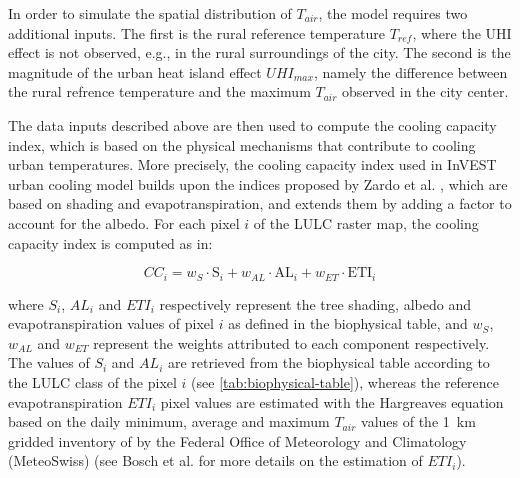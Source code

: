 \documentclass[10pt,letterpaper]{article}
\begin{document}
In order to simulate the spatial distribution of $T_{air}$, the model requires two additional inputs. The first is the rural reference temperature $T_{ref}$, where the UHI effect is not observed, e.g., in the rural surroundings of the city. The second is the magnitude of the urban heat island effect $UHI_{max}$, namely the difference between the rural refrence temperature and the maximum $T_{air}$ observed in the city center.

The data inputs described above are then used to compute the cooling capacity index, which is based on the physical mechanisms that contribute to cooling urban temperatures. More precisely, the cooling capacity index used in InVEST urban cooling model builds upon the indices proposed by Zardo et al. \cite{zardo2017estimating}, which are based on shading and evapotranspiration, and extends them by adding a factor to account for the albedo.
For each pixel $i$ of the LULC raster map, the cooling capacity index is computed as in:

\begin{equation}
  \label{eq:cooling-capacity}
  CC_i = w_{S} \cdot \textrm{S}_i + w_{AL} \cdot \textrm{AL}_i + w_{ET} \cdot \textrm{ETI}_i
\end{equation}

where $S_i$, $AL_i$ and $ETI_i$ respectively represent the tree shading, albedo and evapotranspiration values of pixel $i$ as defined in the biophysical table, and $w_{S}$, $w_{AL}$ and $w_{ET}$ represent the weights attributed to each component respectively.
The values of $S_i$ and $AL_i$ are retrieved from the biophysical table according to the LULC class of the pixel $i$ (see \autoref{tab:biophysical-table}), whereas the reference evapotranspiration $ETI_i$ pixel values are estimated with the Hargreaves equation \cite{hargreaves1985reference} based on the daily minimum, average and maximum $T_{air}$ values of the 1~km gridded inventory of by the Federal Office of Meteorology and Climatology (MeteoSwiss) \cite{frei2014interpolation} (see Bosch et al. \cite{bosch2020spatially} for more details on the estimation of $ETI_i$).
\end{document}
